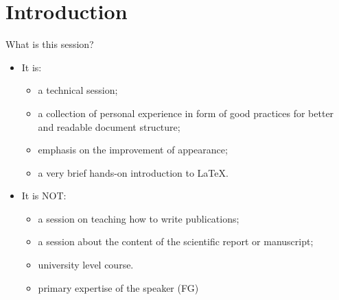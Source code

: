 \documentclass{beamer}
\begin{document}
\section{Introduction}
\begin{frame}{What is this session?}
\begin{itemize}
    \item It is:
    \begin{itemize}
        \item a \color{red}technical \color{black} session;
        \item a collection of personal experience in form of good practices for better and readable document structure;
        \item emphasis on the improvement of appearance; 
        \item a very brief hands-on introduction to \LaTeX{}.
    \end{itemize}
    \item It is NOT: 
    \begin{itemize}
        \item a session on teaching how to write publications;
        \item a session about the content of the scientific report or manuscript;
        \item university level course.
        \item primary expertise of the speaker (\alert{FG})
    \end{itemize}
\end{itemize}
\end{frame}


\end{document}
